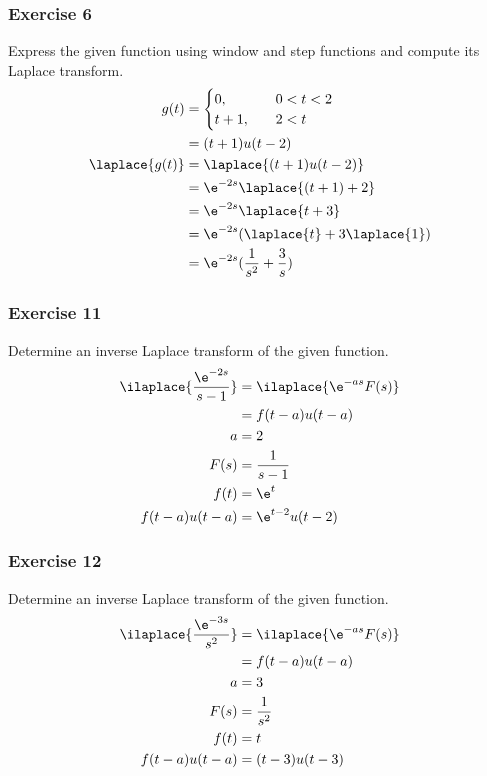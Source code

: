 \documentclass{math}
\begin{document}
\subsubsection*{Exercise 6}
Express the given function using window and step functions and compute its
Laplace transform.
\begin{align*}
  g(t) &= \begin{cases}
    0, &\quad 0<t<2 \\
    t+1, &\quad 2<t
  \end{cases} \\
  &= (t+1)u(t-2) \\
  \laplace{g(t)} &= \laplace{(t+1)u(t-2)} \\
  &= \e^{-2s}\laplace{(t+1)+2} \\
  &= \e^{-2s}\laplace{t+3} \\
  &= \e^{-2s}(\laplace{t}+3\laplace{1}) \\
  &= \e^{-2s}(\frac{1}{s^2}+\frac{3}{s})
\end{align*}

\subsubsection*{Exercise 11}
Determine an inverse Laplace transform of the given function.
\begin{align*}
  \ilaplace{\frac{\e^{-2s}}{s-1}} &= \ilaplace{\e^{-as}F(s)} \\
  &= f(t-a)u(t-a) \\
  a &= 2 \\
  F(s) &= \frac{1}{s-1} \\
  f(t) &= \e^t \\
  f(t-a)u(t-a) &= \e^{t-2}u(t-2)
\end{align*}

\subsubsection*{Exercise 12}
Determine an inverse Laplace transform of the given function.
\begin{align*}
  \ilaplace{\frac{\e^{-3s}}{s^2}} &= \ilaplace{\e^{-as}F(s)} \\
  &= f(t-a)u(t-a) \\
  a &= 3 \\
  F(s) &= \frac{1}{s^2} \\
  f(t) &= t \\
  f(t-a)u(t-a) &= (t-3)u(t-3)
\end{align*}
\end{document}
